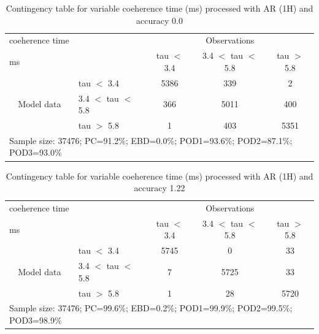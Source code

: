 \documentclass[a4paper,english]{article}
\begin{document}
\begin{table}[]
\begin{center}
\begin{tabular}{llccc}
\hline
{coeherence time}                                       &                                                    & \multicolumn{3}{c}{Observations}                 \\
{ms}                                       &                             & tau $<$ 3.4   & 3.4 $<$ tau $<$ 5.8 & tau $>$ 5.8 \\
\hline
\multicolumn{1}{c}{\multirow{3}{*}{Model data}}  & tau $<$ 3.4             & 5386                & 339                       & 2              \\
                                                 & 3.4  $<$ tau $<$ 5.8 & 366                & 5011                       & 400              \\
                                                 & tau $>$ 5.8             & 1                & 403                       & 5351              \\
\hline
\multicolumn{5}{l}{Sample size: 37476; PC=91.2\%; EBD=0.0\%; POD1=93.6\%; POD2=87.1\%; POD3=93.0\%}
\end{tabular}
\end{center}
\caption{Contingency table for variable coeherence time (ms) processed with AR (1H) and accuracy 0.0}
\label{tab:contingencytauAFT}
\end{table}
\begin{table}[]
\begin{center}
\begin{tabular}{llccc}
\hline
{coeherence time}                                       &                                                    & \multicolumn{3}{c}{Observations}                 \\
{ms}                                       &                             & tau $<$ 3.4   & 3.4 $<$ tau $<$ 5.8 & tau $>$ 5.8 \\
\hline
\multicolumn{1}{c}{\multirow{3}{*}{Model data}}  & tau $<$ 3.4             & 5745                & 0                       & 33              \\
                                                 & 3.4  $<$ tau $<$ 5.8 & 7                & 5725                       & 33              \\
                                                 & tau $>$ 5.8             & 1                & 28                       & 5720              \\
\hline
\multicolumn{5}{l}{Sample size: 37476; PC=99.6\%; EBD=0.2\%; POD1=99.9\%; POD2=99.5\%; POD3=98.9\%}
\end{tabular}
\end{center}
\caption{Contingency table for variable coeherence time (ms) processed with AR (1H) and accuracy 1.22}
\label{tab:contingencytauAFT}
\end{table}
\end{document}
